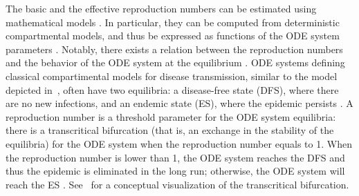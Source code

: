The basic and the effective reproduction numbers can be estimated using mathematical models \cite[]{Ridenhour2018}. In particular, they can be computed from deterministic compartmental models, and thus be expressed as functions of the ODE system parameters \cite[]{Heffernan2005}. Notably, there exists a relation between the reproduction numbers and the behavior of the ODE system at the equilibrium \cite[]{VanDenDriessche2002,VanDenDriessche2008}. ODE systems defining classical compartimental models for disease transmission, similar to the model depicted in~, often have two equilibria: a disease-free state (DFS), where there are no new infections, and an endemic state (ES), where the epidemic persists \cite[]{Hethcote2000,VanDenDriessche2002}. A reproduction number is a threshold parameter for the ODE system equilibria: there is a transcritical bifurcation (that is, an exchange in the stability of the equilibria) for the ODE system when the reproduction number equals to 1. When the reproduction number is lower than 1, the ODE system reaches the DFS and thus the epidemic is eliminated in the long run; otherwise, the ODE system will reach the ES \cite[]{Hethcote2000,VanDenDriessche2002}. See~ for a conceptual visualization of the transcritical bifurcation.

